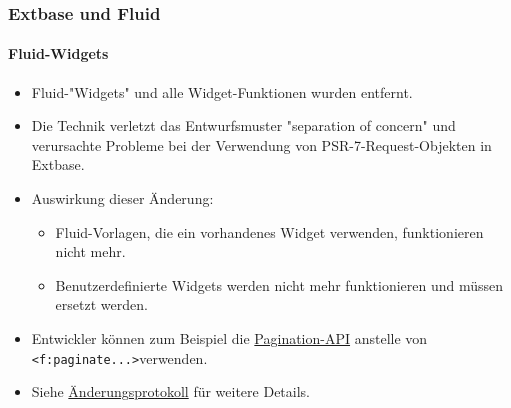%

\begin{frame}[fragile]
	\frametitle{Extbase und Fluid}
	\framesubtitle{Fluid-Widgets}


	\begin{itemize}
		\item Fluid-"Widgets" und alle Widget-Funktionen wurden entfernt.
		\item Die Technik verletzt das Entwurfsmuster "separation of concern"
			und verursachte Probleme bei der Verwendung von PSR-7-Request-Objekten in Extbase.
		\item Auswirkung dieser Änderung:
			\begin{itemize}
				\item Fluid-Vorlagen, die ein vorhandenes Widget verwenden, funktionieren nicht mehr.
				\item Benutzerdefinierte Widgets werden nicht mehr funktionieren und müssen ersetzt werden.
			\end{itemize}
		\item Entwickler können zum Beispiel die
			\href{https://docs.typo3.org/m/typo3/reference-coreapi/master/en-us/ApiOverview/Pagination/Index.html}{Pagination-API}
			anstelle von\newline
			\smaller\texttt{<f:paginate...>}\normalsize\tabto{2.8cm}verwenden.
		\item Siehe \href{https://docs.typo3.org/c/typo3/cms-core/master/en-us/Changelog/10.0/Breaking-92529-AllFluidWidgetFunctionalityRemoved.html}{Änderungsprotokoll}
			für weitere Details.
	\end{itemize}

\end{frame}

